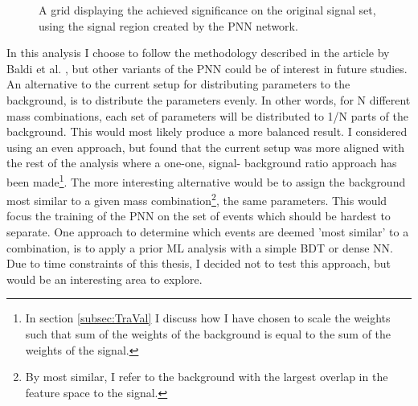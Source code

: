 \begin{figure} 
    \caption{A grid displaying the achieved significance on the original signal set, using the signal region 
    created by the \acs{PNN} network.}
    \label{fig:PNNGridSig}
\end{figure}
In this analysis I choose to follow the methodology described in the article by Baldi et al. \cite{PNN}, but other variants of the \ac{PNN} could 
be of interest in future studies. An alternative to the current setup for distributing parameters to the background, is to distribute the parameters evenly. 
In other words, for N different mass combinations, each set of parameters will be distributed to 1/N parts of the background. This would most likely produce a
more balanced result. I considered using an even approach, but found that the current setup was more aligned with the rest of the analysis where a one-one, signal-
background ratio approach has been made\footnote{In section \ref{subsec:TraVal} I discuss how I have chosen to scale the weights such that sum of the weights of 
the background is equal to the sum of the weights of the signal.}. The more interesting alternative would be to assign the background most similar to a given mass 
combination\footnote{By most similar, I refer to the background with the largest overlap in the feature space to the signal.}, the same parameters. This would 
focus the training of the \ac{PNN} on the set of events which should be hardest to separate. One approach to determine which events are deemed 'most similar' to a 
combination, is to apply a prior \ac{ML} analysis with a simple \ac{BDT} or dense \ac{NN}. Due to time constraints of this thesis, I decided not to test this 
approach, but would be an interesting area to explore.